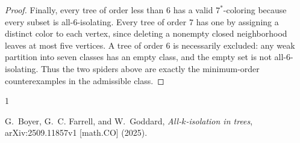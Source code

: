 \documentclass[11pt]{amsart}
\begin{document}
\begin{proof}
Finally, every tree of order less than $6$ has a valid $7^{*}$-coloring
because every subset is all-$6$-isolating.  Every tree of order $7$ has one
by assigning a distinct color to each vertex, since deleting a nonempty
closed neighborhood leaves at most five vertices.  A tree of order $6$ is
necessarily excluded: any weak partition into seven classes has an empty
class, and the empty set is not all-$6$-isolating.  Thus the two spiders above
are exactly the minimum-order counterexamples in the admissible class.
\end{proof}

\begin{thebibliography}{1}

G.~Boyer, G.~C. Farrell, and W.~Goddard,
\emph{All-$k$-isolation in trees},
arXiv:2509.11857v1 [math.CO] (2025).

\end{thebibliography}
\end{document}
